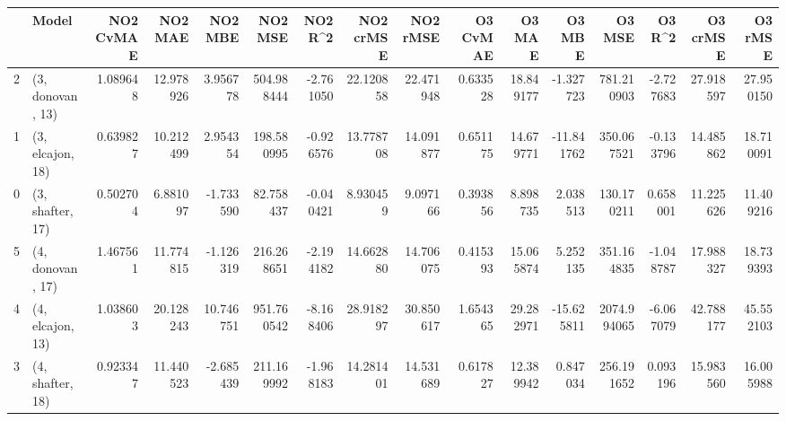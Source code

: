 \begin{tabular}{llrrrrrrrrrrrrrr}
\toprule
{} &             Model &  NO2 CvMAE &    NO2 MAE &    NO2 MBE &     NO2 MSE &   NO2 R\textasciicircum2 &  NO2 crMSE &   NO2 rMSE &  O3 CvMAE &     O3 MAE &     O3 MBE &       O3 MSE &    O3 R\textasciicircum2 &   O3 crMSE &    O3 rMSE \\
\midrule
2 &  (3, donovan, 13) &   1.089648 &  12.978926 &   3.956778 &  504.988444 & -2.761050 &  22.120858 &  22.471948 &  0.633528 &  18.849177 &  -1.327723 &   781.210903 & -2.727683 &  27.918597 &  27.950150 \\
1 &  (3, elcajon, 18) &   0.639827 &  10.212499 &   2.954354 &  198.580995 & -0.926576 &  13.778708 &  14.091877 &  0.651175 &  14.679771 & -11.841762 &   350.067521 & -0.133796 &  14.485862 &  18.710091 \\
0 &  (3, shafter, 17) &   0.502704 &   6.881097 &  -1.733590 &   82.758437 & -0.040421 &   8.930459 &   9.097166 &  0.393856 &   8.898735 &   2.038513 &   130.170211 &  0.658001 &  11.225626 &  11.409216 \\
5 &  (4, donovan, 17) &   1.467561 &  11.774815 &  -1.126319 &  216.268651 & -2.194182 &  14.662880 &  14.706075 &  0.415393 &  15.065874 &   5.252135 &   351.164835 & -1.048787 &  17.988327 &  18.739393 \\
4 &  (4, elcajon, 13) &   1.038603 &  20.128243 &  10.746751 &  951.760542 & -8.168406 &  28.918297 &  30.850617 &  1.654365 &  29.282971 & -15.625811 &  2074.994065 & -6.067079 &  42.788177 &  45.552103 \\
3 &  (4, shafter, 18) &   0.923347 &  11.440523 &  -2.685439 &  211.169992 & -1.968183 &  14.281401 &  14.531689 &  0.617827 &  12.389942 &   0.847034 &   256.191652 &  0.093196 &  15.983560 &  16.005988 \\
\bottomrule
\end{tabular}
